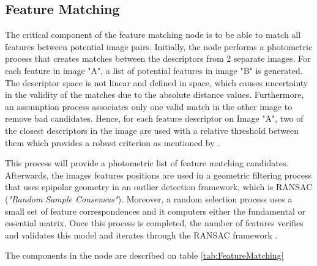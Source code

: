 \documentclass[12pt]{report}
\begin{document}
      \subsection{Feature Matching}
      The critical component of the feature matching node is to be able to match all features between potential image pairs.
      Initially, the node performs a photometric process that creates matches between the descriptors from 2 separate images. For each feature in image "A", a list of potential features in image "B" is generated.
      The descriptor space is not linear and defined in space, which causes uncertainty in the validity of the matches due to the absolute distance values. 
      Furthermore, an assumption process associates only one valid match in the other image to remove bad candidates.
      Hence, for each feature descriptor on Image "A", two of the closest descriptors in the image are used with a relative threshold between them which provides a robust criterion as mentioned by .
      
      This process will provide a photometric list of feature matching candidates. Afterwards, the images features positions are used in a geometric
      filtering process that uses epipolar geometry in an outlier detection framework, which is RANSAC (\textit{"Random Sample Consensus"}).
      Moreover, a random selection process uses a small set of feature correspondences and it computers either the fundamental or essential matrix. 
      Once this process is completed, the number of features verifies and validates this model and iterates through the RANSAC framework .
      \enlargethispage{\baselineskip}
      
      The components in the node are described on table \ref{tab:FeatureMatching}
      
\end{document}

